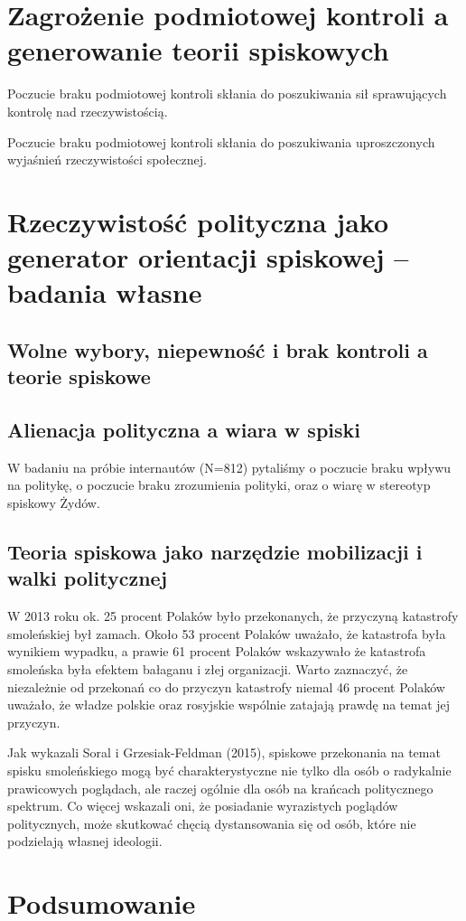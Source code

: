 \documentclass[man]{apa6}
\begin{document}
    \section{Zagrożenie podmiotowej kontroli a generowanie teorii spiskowych}

    Poczucie braku podmiotowej kontroli skłania do poszukiwania sił sprawujących kontrolę nad rzeczywistością.

    Poczucie braku podmiotowej kontroli skłania do poszukiwania uproszczonych wyjaśnień rzeczywistości społecznej.

    \section{Rzeczywistość polityczna jako generator orientacji spiskowej -- badania własne}




    \subsection{Wolne wybory, niepewność i brak kontroli a teorie spiskowe}


    \subsection{Alienacja polityczna a wiara w spiski}

    W badaniu na próbie internautów (N=812) pytaliśmy o poczucie braku wpływu na politykę, o poczucie braku zrozumienia polityki, oraz o wiarę w stereotyp spiskowy Żydów.


    \subsection{Teoria spiskowa jako narzędzie mobilizacji i walki politycznej}



    W 2013 roku ok. 25 procent Polaków było przekonanych, że przyczyną katastrofy smoleńskiej był zamach. Około 53 procent Polaków uważało, że katastrofa była wynikiem wypadku, a prawie 61 procent Polaków wskazywało że katastrofa smoleńska była efektem bałaganu i złej organizacji. Warto zaznaczyć, że niezależnie od przekonań co do przyczyn katastrofy niemal 46 procent Polaków uważało, że władze polskie oraz rosyjskie wspólnie zatajają prawdę na temat jej przyczyn.

    Jak wykazali Soral i Grzesiak-Feldman (2015), spiskowe przekonania na temat spisku smoleńskiego mogą być charakterystyczne nie tylko dla osób o radykalnie prawicowych poglądach, ale raczej ogólnie dla osób na krańcach politycznego spektrum. Co więcej wskazali oni, że posiadanie wyrazistych poglądów politycznych, może skutkować chęcią dystansowania się od osób, które nie podzielają własnej ideologii.


    \section{Podsumowanie}
\end{document}
